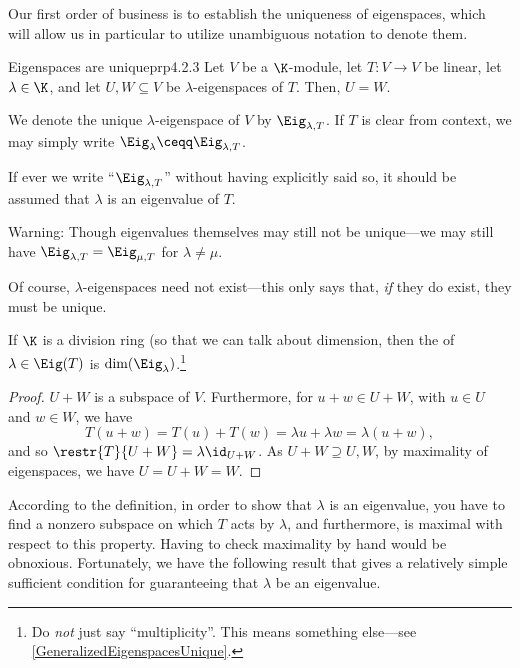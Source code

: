 Our first order of business is to establish the uniqueness of eigenspaces, which will allow us in particular to utilize unambiguous notation to denote them.
\begin{prp}{Eigenspaces are unique}{prp4.2.3}
	Let $V$ be a $\K$-module, let $T\colon V\rightarrow V$ be linear, let $\lambda \in \K$, and let $U,W\subseteq V$ be $\lambda$-eigenspaces of $T$.  Then, $U=W$.
	\begin{rmk}
		We denote the unique $\lambda$-eigenspace of $V$ by $\Eig _{\lambda ,T}$.  If $T$ is clear from context, we may simply write $\Eig _{\lambda}\ceqq \Eig _{\lambda ,T}$.
	\end{rmk}
	\begin{rmk}
		If ever we write ``$\Eig _{\lambda ,T}$'' without having explicitly said so, it should be assumed that $\lambda$ is an eigenvalue of $T$.
	\end{rmk}
	\begin{rmk}
		Warning:  Though eigenvalues themselves may still not be unique---we may still have $\Eig _{\lambda ,T}=\Eig _{\mu ,T}$ for $\lambda \neq \mu$.
	\end{rmk}
	\begin{rmk}
		Of course, $\lambda$-eigenspaces need not exist---this only says that, \emph{if} they do exist, they must be unique.
	\end{rmk}
	\begin{rmk}
		If $\K$ is a division ring (so that we can talk about dimension, then the  of $\lambda \in \Eig (T)$ is $\dim (\Eig _{\lambda})$.\footnote{Do \emph{not} just say ``multiplicity''.  This means something else---see \cref{GeneralizedEigenspacesUnique}.}
	\end{rmk}
	\begin{proof}
		$U+W$ is a subspace of $V$.  Furthermore, for $u+w\in U+W$, with $u\in U$ and $w\in W$, we have
		\begin{equation}
			T(u+w)=T(u)+T(w)=\lambda u+\lambda w=\lambda (u+w),
		\end{equation}
		and so $\restr{T}{U+W}=\lambda \id _{U+W}$.  As $U+W\supseteq U,W$, by maximality of eigenspaces, we have $U=U+W=W$.
	\end{proof}
\end{prp}
According to the definition, in order to show that $\lambda$ is an eigenvalue, you have to find a nonzero subspace on which $T$ acts by $\lambda$, and furthermore, is maximal with respect to this property.  Having to check maximality by hand would be obnoxious.  Fortunately, we have the following result that gives a relatively simple sufficient condition for guaranteeing that $\lambda$ be an eigenvalue.
